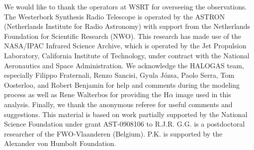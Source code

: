 \documentclass{emulateapj}
\begin{document}
\par 
     We would like to thank the operators at WSRT for overseeing the observations.  The Westerbork Synthesis Radio Telescope is operated by the ASTRON (Netherlands Institute for Radio Astronomy) with support from the Netherlands Foundation for Scientific Research (NWO).  This research has made use of the NASA/IPAC Infrared Science Archive, which is operated by the Jet Propulsion Laboratory, California Institute of Technology, under contract with the National Aeronautics and Space Administration. We acknowledge the HALOGAS team, especially Filippo Fraternali, Renzo Sancisi, Gyula  J\'{o}zsa, Paolo Serra, Tom Oosterloo, and Robert Benjamin for help and comments during the modeling process as well as Rene Walterbos for providing the H$\alpha$ image used in this analysis.  Finally, we thank the anonymous referee for useful comments and suggestions.  This material is based on work partially supported by the National Science Foundation under grant AST-0908106 to R.J.R.  G.G. is a postdoctoral researcher of the FWO-Vlaanderen (Belgium).  P.K. is supported by the Alexander von Humbolt Foundation.



\end{document}

